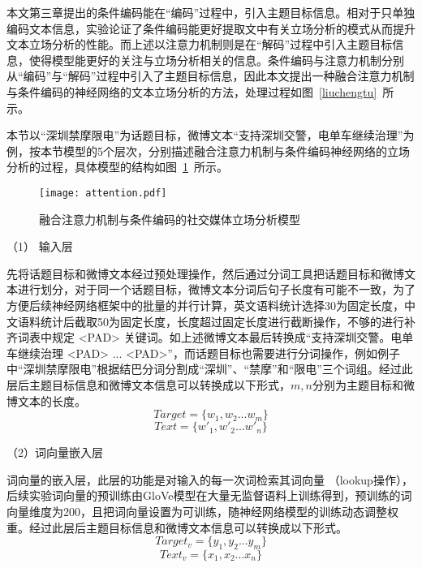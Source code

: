 本文第三章提出的条件编码能在“编码”过程中，引入主题目标信息。相对于只单独编码文本信息，实验论证了条件编码能更好提取文中有关立场分析的模式从而提升文本立场分析的性能。而上述以注意力机制则是在“解码”过程中引入主题目标信息，使得模型能更好的关注与立场分析相关的信息。条件编码与注意力机制分别从“编码”与“解码”过程中引入了主题目标信息，因此本文提出一种融合注意力机制与条件编码的神经网络的文本立场分析的方法，处理过程如图~\ref{liuchengtu}~所示。

本节以“深圳禁摩限电”为话题目标，微博文本“支持深圳交警，电单车继续治理”为例，按本节模型的5个层次，分别描述融合注意力机制与条件编码神经网络的立场分析的过程，具体模型的结构如图~\ref{GRU_CNN}~所示。
\begin{figure}[htbp]
	\centering
	\texttt{[image: attention.pdf]}
	\caption[]{融合注意力机制与条件编码的社交媒体立场分析模型}
	\label{GRU_CNN}
\end{figure}

（1） 输入层

先将话题目标和微博文本经过预处理操作，然后通过分词工具把话题目标和微博文本进行划分，对于同一个话题目标，微博文本分词后句子长度有可能不一致，为了方便后续神经网络框架中的批量的并行计算，英文语料统计选择30为固定长度，中文语料统计后截取50为固定长度，长度超过固定长度进行截断操作，不够的进行补齐词表中规定 <PAD> 关键词。如上述微博文本最后转换成“支持深圳交警。电单车继续治理 <PAD> ... <PAD>”，而话题目标也需要进行分词操作，例如例子中“深圳禁摩限电”根据结巴分词分割成“深圳”、“禁摩”和“限电”三个词组。经过此层后主题目标信息和微博文本信息可以转换成以下形式，$m,n$分别为主题目标和微博文本的长度。
\begin{equation}\label{target_info} Target= \lbrace w_1,w_2...w_m\rbrace \end{equation}
\begin{equation}\label{text_info} Text=\lbrace w'_1,w'_2...w'_n\rbrace  \end{equation}

（2）词向量嵌入层

词向量的嵌入层，此层的功能是对输入的每一次词检索其词向量 （lookup操作），后续实验词向量的预训练由GloVe模型在大量无监督语料上训练得到，预训练的词向量维度为200，且把词向量设置为可训练，随神经网络模型的训练动态调整权重。经过此层后主题目标信息和微博文本信息可以转换成以下形式。
\begin{equation}\label{target_info} Target_v= \lbrace y_1,y_2...y_m\rbrace \end{equation}
\begin{equation}\label{text_info} Text_v=\lbrace x_1,x_2...x_n\rbrace \end{equation}

